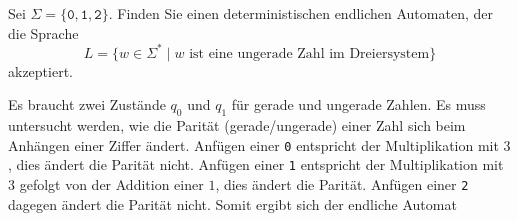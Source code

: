 Sei $\Sigma=\{\texttt{0},\texttt{1},\texttt{2}\}$.
Finden Sie einen deterministischen endlichen Automaten, der die
Sprache
\[
L
=
\{
w\in \Sigma^*
\mid
\text{$w$ ist eine ungerade Zahl im Dreiersystem}
\}
\]
akzeptiert.


\begin{loesung}
Es braucht zwei Zustände $q_0$ und $q_1$ für gerade und ungerade
Zahlen.
Es muss untersucht werden, wie die Parität (gerade/ungerade) einer
Zahl sich beim Anhängen einer Ziffer ändert.
Anfügen einer \texttt{0} entspricht der Multiplikation mit $3$,
dies ändert die Parität nicht.
Anfügen einer \texttt{1} entspricht der Multiplikation mit $3$
gefolgt von der Addition einer $1$, dies ändert die Parität.
Anfügen einer \texttt{2} dagegen ändert die Parität nicht.
Somit ergibt sich der endliche Automat
\begin{center}
\end{center}
\end{loesung}
